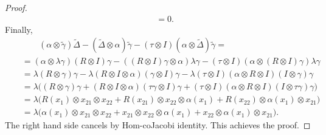 \documentclass{article}
\theoremstyle{definition}
\theoremstyle{remark}
\numberwithin{equation}{section}
\begin{document}
\begin{proof}
\begin{eqnarray}
&&=0.\nonumber
\end{eqnarray}
Finally,
\begin{eqnarray}
&& \qquad(\alpha\otimes\tilde\gamma)\tilde\Delta-(\tilde\Delta\otimes \alpha)\tilde\gamma-(\tau\otimes I)(\alpha\otimes\tilde\Delta)\tilde\gamma=\nonumber\\
&&=(\alpha\otimes\lambda\gamma)(R\otimes I)\gamma-((R\otimes I)\gamma\otimes \alpha)\lambda\gamma
-(\tau\otimes I)(\alpha\otimes(R\otimes I)\gamma)\lambda\gamma\nonumber\\
&&=\lambda(R\otimes\gamma)\gamma-\lambda(R\otimes I\otimes \alpha)(\gamma\otimes I)\gamma
-\lambda(\tau\otimes I)(\alpha\otimes R\otimes I)(I\otimes\gamma)\gamma\nonumber\\
&&=\lambda\Big((R\otimes\gamma)\gamma+(R\otimes I\otimes \alpha)(\tau\gamma\otimes I)\gamma
+(\tau\otimes I)(\alpha\otimes R\otimes I)(I\otimes\tau\gamma)\gamma\Big)\nonumber\\
&&=\lambda\Big(R(x_{1})\otimes x_{21}\otimes x_{22}+R(x_{21})\otimes x_{22}\otimes \alpha(x_{1})+R(x_{22})\otimes\alpha(x_{1})\otimes x_{21}\Big)\nonumber\\
&&=\lambda\Big(\alpha(x_{1})\otimes x_{21}\otimes x_{22}+x_{21}\otimes x_{22}\otimes \alpha(x_{1})+x_{22}\otimes\alpha(x_{1})\otimes x_{21}\Big)\nonumber.
\end{eqnarray}
The right hand side cancels by Hom-coJacobi identity. This achieves the proof.
\end{proof}
\end{document}
